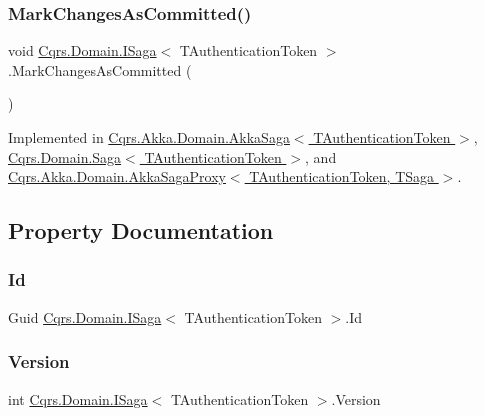 \mbox{\label{interfaceCqrs_1_1Domain_1_1ISaga_a85c75f80bc5be4bad7f1d9f1231bfba7}} 
\subsubsection{\texorpdfstring{Mark\+Changes\+As\+Committed()}{MarkChangesAsCommitted()}}
{\footnotesize\ttfamily void \hyperlink{interfaceCqrs_1_1Domain_1_1ISaga}{Cqrs.\+Domain.\+I\+Saga}$<$ T\+Authentication\+Token $>$.Mark\+Changes\+As\+Committed (\begin{DoxyParamCaption}{ }\end{DoxyParamCaption})}



Implemented in \hyperlink{classCqrs_1_1Akka_1_1Domain_1_1AkkaSaga_a83269fac4653cca097461e924feaea7f}{Cqrs.\+Akka.\+Domain.\+Akka\+Saga$<$ T\+Authentication\+Token $>$}, \hyperlink{classCqrs_1_1Domain_1_1Saga_a9caac842ea6e88d6e502b63ca1820fe4}{Cqrs.\+Domain.\+Saga$<$ T\+Authentication\+Token $>$}, and \hyperlink{classCqrs_1_1Akka_1_1Domain_1_1AkkaSagaProxy_a5a5c012bc0f7f957b8bd2298956ca9ae}{Cqrs.\+Akka.\+Domain.\+Akka\+Saga\+Proxy$<$ T\+Authentication\+Token, T\+Saga $>$}.



\subsection{Property Documentation}
\mbox{\label{interfaceCqrs_1_1Domain_1_1ISaga_aa470a39d3bcdc506dbd5bf49d127bc3c}} 
\subsubsection{\texorpdfstring{Id}{Id}}
{\footnotesize\ttfamily Guid \hyperlink{interfaceCqrs_1_1Domain_1_1ISaga}{Cqrs.\+Domain.\+I\+Saga}$<$ T\+Authentication\+Token $>$.Id\hspace{0.3cm}{\ttfamily [get]}}

\mbox{\label{interfaceCqrs_1_1Domain_1_1ISaga_a83a02ff45543d670356dde4149cdc614}} 
\subsubsection{\texorpdfstring{Version}{Version}}
{\footnotesize\ttfamily int \hyperlink{interfaceCqrs_1_1Domain_1_1ISaga}{Cqrs.\+Domain.\+I\+Saga}$<$ T\+Authentication\+Token $>$.Version\hspace{0.3cm}{\ttfamily [get]}}

